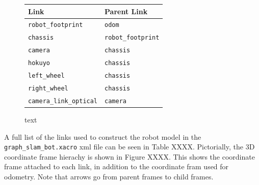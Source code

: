 \documentclass[a4paper]{article}
\begin{document}
\begin{figure}[h]
\begin{minipage}{0.45\textwidth}
	\centering
	\caption{text}
\end{minipage}
\hspace{1cm}
\begin{minipage}{0.45\textwidth}
	\begin{tabular}{ll}
		\toprule
		\textbf{Link} & \textbf{Parent Link} \\
		\midrule
		\texttt{robot\_footprint} & \texttt{odom} \\
		\texttt{chassis} & \texttt{robot\_footprint} \\
		\texttt{camera} & \texttt{chassis} \\
		\texttt{hokuyo} & \texttt{chassis} \\
		\texttt{left\_wheel} & \texttt{chassis} \\
		\texttt{right\_wheel} & \texttt{chassis} \\
		\texttt{camera\_link\_optical} & \texttt{camera} \\
		\bottomrule
	\end{tabular}
\end{minipage}
\end{figure}

A full list of the links used to construct the robot model in the \texttt{graph\_slam\_bot.xacro} xml file can be seen in Table XXXX. Pictorially, the 3D coordinate frame hierachy is shown in Figure XXXX. This shows the coordinate frame attached to each link, in addition to the coordinate fram used for odometry. Note that arrows go from parent frames to child frames.
\end{document}
